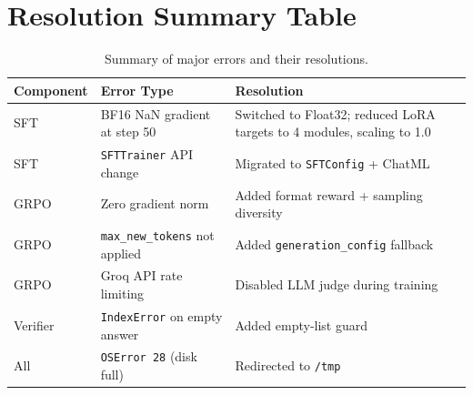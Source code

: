 \documentclass[12pt]{report}
\begin{document}
\section{Resolution Summary Table}
\begin{table}[H]
\centering
\begin{tabular}{|l|p{5cm}|p{5.5cm}|}
\hline
\textbf{Component} & \textbf{Error Type} & \textbf{Resolution} \\ \hline
SFT & BF16 NaN gradient at step 50 & Switched to Float32; reduced LoRA targets to 4 modules, scaling to 1.0 \\ \hline
SFT & \texttt{SFTTrainer} API change & Migrated to \texttt{SFTConfig} + ChatML \\ \hline
GRPO & Zero gradient norm & Added format reward + sampling diversity \\ \hline
GRPO & \texttt{max\_new\_tokens} not applied & Added \texttt{generation\_config} fallback \\ \hline
GRPO & Groq API rate limiting & Disabled LLM judge during training \\ \hline
Verifier & \texttt{IndexError} on empty answer & Added empty-list guard \\ \hline
All & \texttt{OSError 28} (disk full) & Redirected to \texttt{/tmp} \\ \hline
\end{tabular}
\caption{Summary of major errors and their resolutions.}
\end{table}




\end{document}
